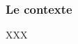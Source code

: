 \documentclass[10pt, a4paper]{article}
\begin{document}

\subsubsection{Le contexte }

XXX
\end{document}
